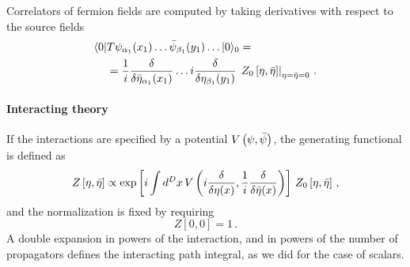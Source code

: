 Correlators of fermion fields are computed by taking derivatives with
respect to the source fields
\begin{align}
  \langle 0 |& T \psi_{\alpha_1}(x_1) \ldots \bar{\psi}_{\beta_1}(y_1)
  \ldots |0\rangle_0  = \nonumber \\
   &=\frac{1}{i} \frac{\delta}{\delta\bar{\eta}_{\alpha_1}(x_1)} \ldots
  i \frac{\delta}{\delta\eta_{\beta_1}(y_1)}\, 
  \left. Z_0\left[\eta, \bar{\eta}\right] \right|_{\eta=\bar{\eta}=0}\, .
\end{align}

\paragraph{Interacting theory}

If the interactions are specified by a potential
$V\left(\psi,\bar{\psi}\right)$, the generating functional is defined as 
\begin{equation}
  \label{eq:InterGenFunc}
  Z\left[\eta,\bar{\eta}\right] \propto
  \exp\left[
    i \int d^Dx\, V\left( i \frac{\delta}{\delta\eta(x)}, 
    \frac{1}{i} \frac{\delta}{\delta\bar{\eta}(x)}\right)
  \right] \, 
  Z_0\left[\eta, \bar{\eta} \right]\, , 
\end{equation}
and the normalization is fixed by requiring
\begin{equation}
  \label{eq:ZNorm}
  Z[0,0] = 1\, .
\end{equation}
A double expansion in powers of the interaction, and in powers of the
number of propagators defines the interacting path integral, as we did
for the case of scalars. 

